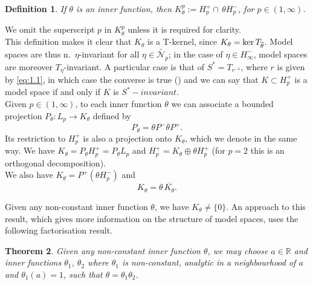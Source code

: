 \documentclass[11pt]{article}
\def\RR{\mathbb{R}}
\def\Np{\widetilde{\mathcal{N}_p}}
\def\ker{\mathop{\rm ker}\nolimits}
\def\nei#1{n.~$#1$-in\-vari\-ant}
\def\ol{\overline}
\newtheorem{thm}{Theorem}[section]
\newtheorem{defn}[thm]{Definition}
\numberwithin{equation}{section}
\begin{document}
\begin{defn}
If $\theta$ is an inner function, then $K_{\theta}^p:= H_p^+ \cap \, \theta H_p^-$, for $p \in (1, \infty)$.
\end{defn}

We omit the superscript $p$ in $K_{\theta}^p$ unless it is required for clarity.\\

This definition makes it clear that $K_\theta$ is a T-kernel, since $K_\theta= \ker T_{\ol\theta}$.
Model spaces are thus \nei{\eta} for all $\eta \in \Np$; in the case of $\eta \in H_\infty^-$, model spaces are moreover $T_{\eta}$-invariant.
A particular case is that of $S^*=T_{r^{-1}}$, where $r$ is given by \eqref {eq:1.1},
in which case the converse is true (\cite{Gamelin})  and we can say that $K \subset H_p^+$ is a model space
if and only if $K$ is $S^*-invariant$.\\


Given $p\in (1,\infty)$, to each inner function $\theta$ we can associate a bounded projection $P_\theta: L_p \to K_{\theta}$ defined by
\begin{equation}\label{2.2}
P_\theta = \theta P^- \overline\theta P^+.
\end{equation}
Its restriction to $H_p^+$ is also a projection onto $K_{\theta}$, which we denote in the same way.
We have $K_{\theta}=P_\theta H_p^+ = P_\theta L_p$ and $H_p^+ = K_{\theta} \oplus \theta H_p^+$ (for $p=2$ this is
an orthogonal decomposition).\\

We also have $K_{\theta}=P^+(\theta H_p^-)$ and
\begin{equation}\label{2.3}
K_\theta=\theta \, \overline{K_\theta}.
\end{equation}

Given any non-constant inner function $\theta$, we have $K_{\theta}\neq \{0\}$. An approach to this result, which gives more information on the structure of model spaces, uses the following factorisation result.


\begin{thm}\label{lem:16}
Given any non-constant inner function $\theta$,  we may choose $a \in \RR$ and inner functions $\theta_1$, $\theta_2$ where  $\theta_1$ is non-constant, analytic in a neighbourhood of $a$ and $\theta_1(a)=1$,
such that $\theta=\theta_1 \theta_2$.
\end{thm}
\end{document}
